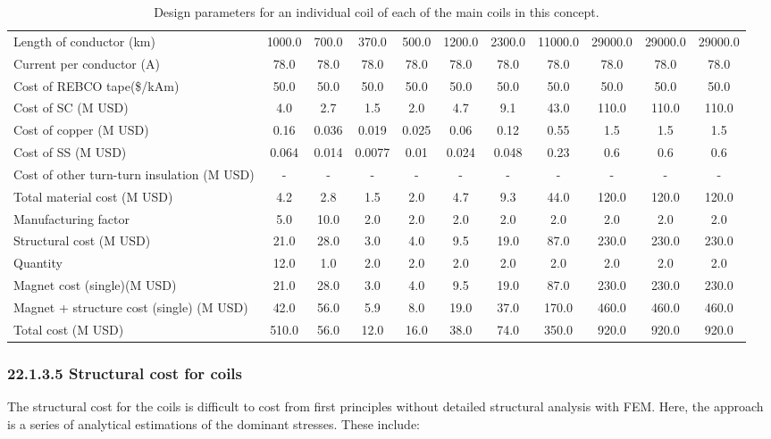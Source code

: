 \begin{table}[h]
{\begin{tabular}{lcccccccccc}
Length of conductor (km) & 1000.0 & 700.0 & 370.0 & 500.0 & 1200.0 & 2300.0 & 11000.0 & 29000.0 & 29000.0 & 29000.0 \\
Current per conductor (A) & 78.0 & 78.0 & 78.0 & 78.0 & 78.0 & 78.0 & 78.0 & 78.0 & 78.0 & 78.0 \\
\hline
Cost of REBCO tape(\$/kAm) & 50.0 & 50.0 & 50.0 & 50.0 & 50.0 & 50.0 & 50.0 & 50.0 & 50.0 & 50.0 \\
Cost of SC (M USD) & 4.0 & 2.7 & 1.5 & 2.0 & 4.7 & 9.1 & 43.0 & 110.0 & 110.0 & 110.0 \\
Cost of copper (M USD) & 0.16 & 0.036 & 0.019 & 0.025 & 0.06 & 0.12 & 0.55 & 1.5 & 1.5 & 1.5 \\
Cost of SS (M USD) & 0.064 & 0.014 & 0.0077 & 0.01 & 0.024 & 0.048 & 0.23 & 0.6 & 0.6 & 0.6 \\
Cost of other turn-turn insulation (M USD) & - & - & - & - & - & - & - & - & - & - \\
Total material cost (M USD) & 4.2 & 2.8 & 1.5 & 2.0 & 4.7 & 9.3 & 44.0 & 120.0 & 120.0 & 120.0 \\
Manufacturing factor & 5.0 & 10.0 & 2.0 & 2.0 & 2.0 & 2.0 & 2.0 & 2.0 & 2.0 & 2.0 \\
Structural cost (M USD) & 21.0 & 28.0 & 3.0 & 4.0 & 9.5 & 19.0 & 87.0 & 230.0 & 230.0 & 230.0 \\
Quantity & 12.0 & 1.0 & 2.0 & 2.0 & 2.0 & 2.0 & 2.0 & 2.0 & 2.0 & 2.0 \\
Magnet cost (single)(M USD) & 21.0 & 28.0 & 3.0 & 4.0 & 9.5 & 19.0 & 87.0 & 230.0 & 230.0 & 230.0 \\
Magnet + structure cost (single) (M USD) & 42.0 & 56.0 & 5.9 & 8.0 & 19.0 & 37.0 & 170.0 & 460.0 & 460.0 & 460.0 \\
\hline
Total cost (M USD) & 510.0 & 56.0 & 12.0 & 16.0 & 38.0 & 74.0 & 350.0 & 920.0 & 920.0 & 920.0 \\
\hline
\end{tabular}}
\caption{Design parameters for an individual coil of each of the main coils in this concept.}
\label{your-table-label}
\end{table}


\subsubsection*{22.1.3.5 Structural cost for coils}

The structural cost for the coils is difficult to cost from first principles without detailed structural analysis with FEM. Here, the approach is a series of analytical estimations of the dominant stresses. These include:

